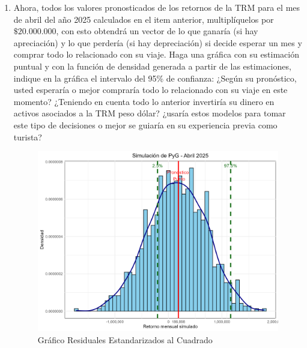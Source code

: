 \documentclass{article}
\theoremstyle{remark}
\theoremstyle{definition}
\begin{document}
\begin{enumerate}[label = \emph{\alph*})]
\begin{tcolorbox}[title=Soluci\'on 2.i]
\begin{figure}[H]
                \caption{Gr\'afico Residuales Estandarizados al Cuadrado}
                \label{fig:graf_residstd2}
            \end{figure}
            En el g\'afico anterior se puede ver la densidad para las 1000 simulaciones de los retornos de la TRM en abril. El intervalo de confianza del 95\% incluye una pequeña porci\'on de retornos negativos (caida de la TRM), sin embargo, la mayor parte del intervalo (y de las simulaciones) arrojaron un valor positivo para el retorno en abril (aumento de la TRM, depreciaci\'on del Peso frente al dolar). Debido a esto, y a pesar de la existencia de una pequeña probabilidad de apreciaci\'on del peso, se recomienda comprar las cosas denominadas en d\'olares en el presente, ya que el promedio de la TRM en abril se espera que sea mayor, lo que encarecer\'ia el valor de estos bienes, por la depreciaci\'on.
        \end{tcolorbox}
    \item {Ahora, todos los valores pronosticados de los retornos de la TRM para el mes de abril del año 2025 calculados en el item anterior, multipl\'iquelos por $\$20.000.000$, con esto obtendr\'a un vector de lo que ganar\'ia (si hay apreciaci\'on) y lo que perder\'ia (si hay depreciaci\'on) si decide esperar un mes y comprar todo lo relacionado con su viaje. Haga una gr\'afica con su estimaci\'on puntual y con la funci\'on de densidad generada a partir de las estimaciones, indique en la gr\'afica el intervalo del 95\% de confianza: ¿Seg\'un su pron\'ostico, usted esperar\'ia o mejor comprar\'ia todo lo relacionado con su viaje en este momento? ¿Teniendo en cuenta todo lo anterior invertir\'ia su dinero en activos asociados a la TRM peso d\'olar? ¿usar\'ia estos modelos para tomar este tipo de decisiones o mejor se guiar\'ia en su experiencia previa como turista?}
        \begin{tcolorbox}[title=Soluci\'on 2.j]
            \begin{figure}[H]
                \centering
                \includegraphics[width=0.9\linewidth]{output/hist_sim_pg.png}
                \caption{Gr\'afico Residuales Estandarizados al Cuadrado}
                \label{fig:graf_residstd2}
            \end{figure}
            

\end{tcolorbox}
\end{enumerate}
\end{document}

